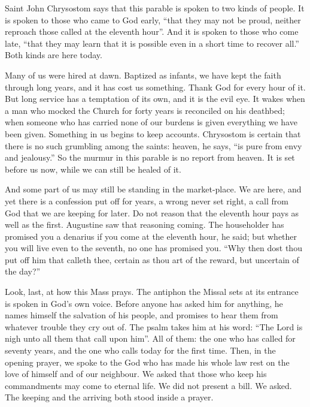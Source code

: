 \bigskip

Saint John Chrysostom says that this parable is spoken to two kinds of
people. It is spoken to those who came to God early, ``that they may not be
proud, neither reproach those called at the eleventh hour''. And it is spoken
to those who come late, ``that they may learn that it is possible even in a
short time to recover all.'' Both kinds are here today.

Many of us were hired at dawn. Baptized as infants, we have kept the faith
through long years, and it has cost us something. Thank God for every hour
of it. But long service has a temptation of its own, and it is the evil eye.
It wakes when a man who mocked the Church for forty years is reconciled on
his deathbed; when someone who has carried none of our burdens is given
everything we have been given. Something in us begins to keep accounts.
Chrysostom is certain that there is no such grumbling among the saints:
heaven, he says, ``is pure from envy and jealousy.'' So the murmur in this
parable is no report from heaven. It is set before us now, while we can
still be healed of it.

And some part of us may still be standing in the market-place. We are here,
and yet there is a confession put off for years, a wrong never set right, a
call from God that we are keeping for later. Do not reason that the eleventh
hour pays as well as the first. Augustine saw that reasoning coming. The
householder has promised you a denarius if you come at the eleventh hour, he
said; but whether you will live even to the seventh, no one has promised
you. ``Why then dost thou put off him that calleth thee, certain as thou art
of the reward, but uncertain of the day?''

\bigskip

Look, last, at how this Mass prays. The antiphon the Missal sets at its
entrance is spoken in God's own voice. Before anyone has asked him for
anything, he names himself the salvation of his people, and promises to hear
them from whatever trouble they cry out of. The psalm takes him at his word:
``The Lord is nigh unto all them that call upon him''. All of them: the one
who has called for seventy years, and the one who calls today for the first
time. Then, in the opening prayer, we spoke to the God who has made his
whole law rest on the love of himself and of our neighbour. We asked that
those who keep his commandments may come to eternal life. We did not present
a bill. We asked. The keeping and the arriving both stood inside a prayer.

